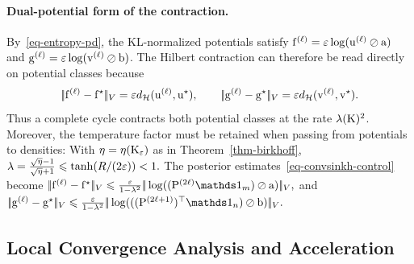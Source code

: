 \paragraph{Dual-potential form of the contraction.}
By~\eqref{eq-entropy-pd}, the KL-normalized potentials satisfy
\(
\mathrm{f}^{(\ell)}=\varepsilon\log(\mathrm{u}^{(\ell)}\oslash\mathrm{a})
\)
and
\(
\mathrm{g}^{(\ell)}=\varepsilon\log(\mathrm{v}^{(\ell)}\oslash\mathrm{b})
\).
The Hilbert contraction can therefore be read directly on potential classes because
\[
|\!| \mathrm{f}^{(\ell)}-\mathrm{f}^\star |\!|_V
=
\varepsilon d_{\mathcal{H}}(\mathrm{u}^{(\ell)},\mathrm{u}^\star),
\qquad
|\!| \mathrm{g}^{(\ell)}-\mathrm{g}^\star |\!|_V
=
\varepsilon d_{\mathcal{H}}(\mathrm{v}^{(\ell)},\mathrm{v}^\star).
\]
Thus a complete cycle contracts both potential classes at the rate $\lambda(\mathrm{K})^2$. Moreover, the temperature factor must be retained when passing from potentials to densities:
With $\eta=\eta(\mathrm{K}_\varepsilon)$ as in Theorem~\ref{thm-birkhoff}, \(\lambda=\frac{\sqrt{\eta}-1}{\sqrt{\eta}+1} \leqslant \tanh(R/(2\varepsilon))<1.\)
The posterior estimates~\eqref{eq-convsinkh-control} become
\(\norm{\fD^{(\ell)}-\fD^\star}_V \leq \frac{\epsilon}{1-\la^2} \norm{\log((\P^{(2\ell)}\ones_m)\oslash\a)}_V,\)
and
\(\norm{\gD^{(\ell)}-\gD^\star}_V \leq \frac{\epsilon}{1-\la^2} \norm{\log(((\P^{(2\ell+1)})^\top\ones_n)\oslash\b)}_V.\)
\subsection{Local Convergence Analysis and Acceleration}
\label{sec-sinkhorn-local-acceleration}
